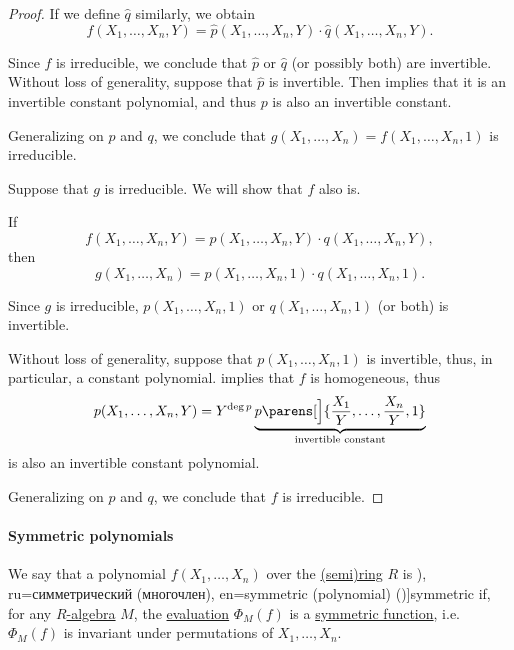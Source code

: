 \begin{proof}
  If we define \( \widehat{q} \) similarly, we obtain
  \begin{equation*}
    f(X_1, \ldots, X_n, Y) = \widehat p(X_1, \ldots, X_n, Y) \cdot \widehat q(X_1, \ldots, X_n, Y).
  \end{equation*}

  Since \( f \) is irreducible, we conclude that \( \widehat{p} \) or \( \widehat{q} \) (or possibly both) are invertible. Without loss of generality, suppose that \( \widehat{p} \) is invertible. Then  implies that it is an invertible constant polynomial, and thus \( p \) is also an invertible constant.

  Generalizing on \( p \) and \( q \), we conclude that \( g(X_1, \ldots, X_n) = f(X_1, \ldots, X_n, 1) \) is irreducible.

  \NecessitySubProof Suppose that \( g \) is irreducible. We will show that \( f \) also is.

  If
  \begin{equation*}
    f(X_1, \ldots, X_n, Y) = p(X_1, \ldots, X_n, Y) \cdot q(X_1, \ldots, X_n, Y),
  \end{equation*}
  then
  \begin{equation*}
    g(X_1, \ldots, X_n) = p(X_1, \ldots, X_n, 1) \cdot q(X_1, \ldots, X_n, 1).
  \end{equation*}

  Since \( g \) is irreducible, \( p(X_1, \ldots, X_n, 1) \) or \( q(X_1, \ldots, X_n, 1) \) (or both) is invertible.

  Without loss of generality, suppose that \( p(X_1, \ldots, X_n, 1) \) is invertible, thus, in particular, a constant polynomial.  implies that \( f \) is homogeneous, thus
  \begin{equation*}
    p(X_1, \ldots, X_n, Y) = Y^{\deg p} \underbrace{p\parens[\Big]{ \frac {X_1} Y, \ldots, \frac {X_n} Y, 1 }}_{\T{invertible constant}}
  \end{equation*}
  is also an invertible constant polynomial.

  Generalizing on \( p \) and \( q \), we conclude that \( f \) is irreducible.
\end{proof}

\paragraph{Symmetric polynomials}

\begin{definition}\label{def:symmetric_polynomial}
  We say that a polynomial \( f(X_1, \ldots, X_n) \) over the \hyperref[def:semiring]{(semi)ring} \( R \) is \term[bg=симетричен (полином) (\cite[58]{ГеновМиховскиМоллов1991Алгебра}), ru=симметрический (многочлен), en=symmetric (polynomial) (\cite[190]{Lang2002Algebra})]{symmetric} if, for any \hyperref[def:algebra_over_semiring]{\( R \)-algebra} \( M \), the \hyperref[con:evaluation_homomorphism]{evaluation} \( \Phi_M(f) \) is a \hyperref[def:symmetric_function]{symmetric function}, i.e. \( \Phi_M(f) \) is invariant under permutations of \( X_1, \ldots, X_n \).
\end{definition}

